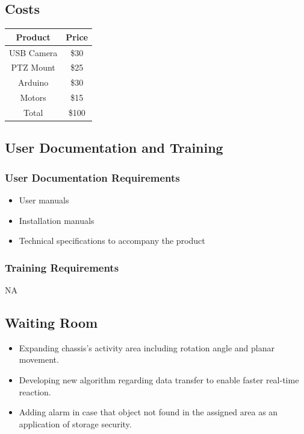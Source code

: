 \documentclass[12pt]{article}
\begin{document}
\subsection{Costs}
\begin{large}
\begin{center}
    \begin{tabular}{|| c || c ||}
    \hline
    Product & Price\\
    \hline\hline
    USB Camera & \$30\\
    \hline
    PTZ Mount & \$25\\
    \hline
    Arduino & \$30\\
    \hline
    Motors & \$15\\
    \hline
    Total & \$100\\
    \hline
    \end{tabular}
\end{center}
\end{large}
\subsection{User Documentation and Training}
    \subsubsection{User Documentation Requirements}
    \begin{itemize}
        \item User manuals
        \item Installation manuals
        \item Technical specifications to accompany the product
    \end{itemize}
    
    \subsubsection{Training Requirements}
    NA
\subsection{Waiting Room}
\begin{itemize}
    \item Expanding chassis's activity area including rotation angle and planar movement.
    \item Developing new algorithm regarding data transfer to enable faster real-time reaction.
    \item Adding alarm in case that object not found in the assigned area as an application of storage security.
\end{itemize}
\end{document}
